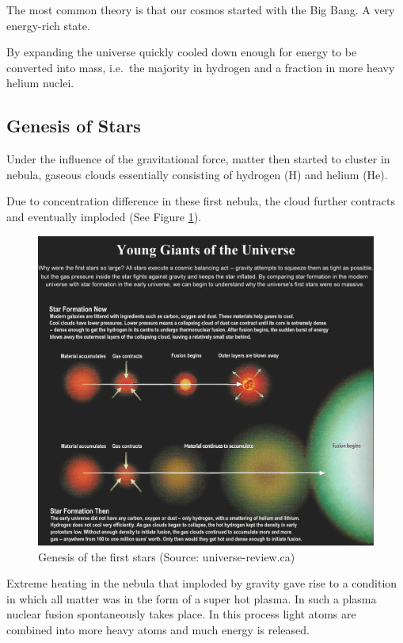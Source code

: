 \documentclass[
  11pt,
]{book}
\begin{document}
The most common theory is that our cosmos started with the Big Bang.
A very energy-rich state.

By expanding the universe quickly cooled down enough for energy to be converted into mass, i.e.~the majority in hydrogen and a fraction in more heavy helium nuclei.

\hypertarget{genesis-of-stars}{%
\subsection{Genesis of Stars}\label{genesis-of-stars}}

Under the influence of the gravitational force, matter then started to cluster in nebula, gaseous clouds essentially consisting of hydrogen (H) and helium (He).

Due to concentration difference in these first nebula, the cloud further contracts and eventually imploded (See Figure \ref{fig:genesisStar}).

\begin{figure}

{\centering \includegraphics[width=1\linewidth]{./figs/I08-13-firststars6} 

}

\caption{Genesis of the first stars (Source: universe-review.ca)}\label{fig:genesisStar}
\end{figure}

Extreme heating in the nebula that imploded by gravity gave rise to a condition in which all matter was in the form of a super hot plasma.
In such a plasma nuclear fusion spontaneously takes place. In this process light atoms are combined into more heavy atoms and much energy is released.
\end{document}

